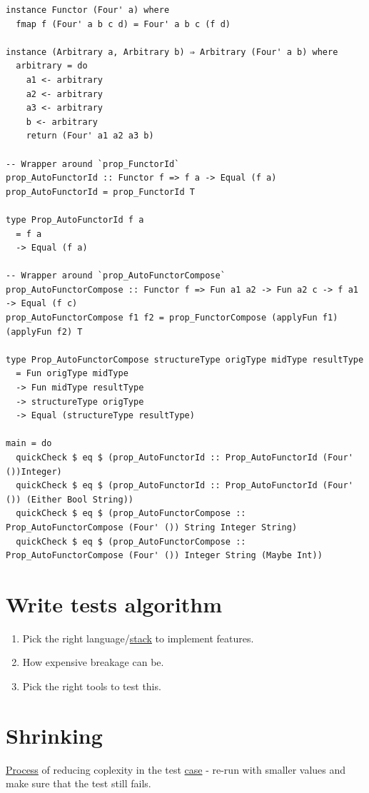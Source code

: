 \documentclass[a4paper,14pt,oneside]{book}
\begin{document}
{\begin{verbatim}
instance Functor (Four' a) where
  fmap f (Four' a b c d) = Four' a b c (f d)

instance (Arbitrary a, Arbitrary b) ⇒ Arbitrary (Four' a b) where
  arbitrary = do
    a1 <- arbitrary
    a2 <- arbitrary
    a3 <- arbitrary
    b <- arbitrary
    return (Four' a1 a2 a3 b)

-- Wrapper around `prop_FunctorId`
prop_AutoFunctorId :: Functor f => f a -> Equal (f a)
prop_AutoFunctorId = prop_FunctorId T

type Prop_AutoFunctorId f a
  = f a
  -> Equal (f a)

-- Wrapper around `prop_AutoFunctorCompose`
prop_AutoFunctorCompose :: Functor f => Fun a1 a2 -> Fun a2 c -> f a1 -> Equal (f c)
prop_AutoFunctorCompose f1 f2 = prop_FunctorCompose (applyFun f1) (applyFun f2) T

type Prop_AutoFunctorCompose structureType origType midType resultType
  = Fun origType midType
  -> Fun midType resultType
  -> structureType origType
  -> Equal (structureType resultType)

main = do
  quickCheck $ eq $ (prop_AutoFunctorId :: Prop_AutoFunctorId (Four' ())Integer)
  quickCheck $ eq $ (prop_AutoFunctorId :: Prop_AutoFunctorId (Four' ()) (Either Bool String))
  quickCheck $ eq $ (prop_AutoFunctorCompose :: Prop_AutoFunctorCompose (Four' ()) String Integer String)
  quickCheck $ eq $ (prop_AutoFunctorCompose :: Prop_AutoFunctorCompose (Four' ()) Integer String (Maybe Int))
\end{verbatim}

\section{Write tests algorithm}
\label{sec:orga8401b5}

\begin{enumerate}
\item Pick the right language/\hyperref[org507f473]{stack} to implement features.\\
\item How expensive breakage can be.\\
\item Pick the right tools to test this.\\
\end{enumerate}

\section{\label{org1989dc2}Shrinking}
\label{sec:orge847913}
\hyperref[orgada3bb8]{Process} of reducing coplexity in the test \hyperref[org6609611]{case} - re-run with smaller values and make sure that the test still fails.\\

}
\end{document}
